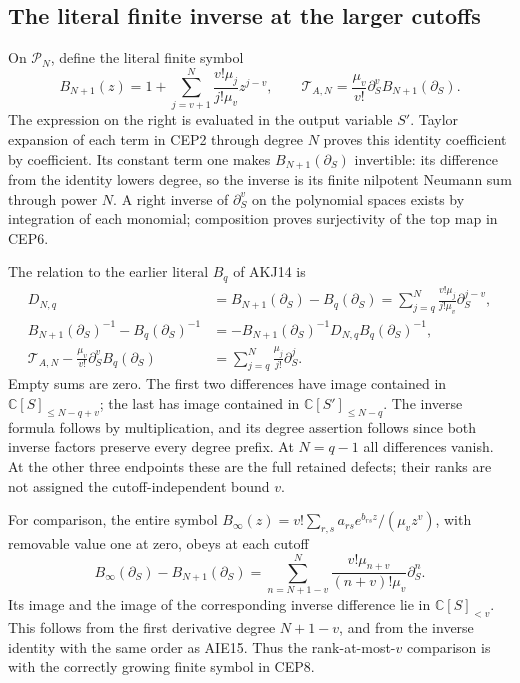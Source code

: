 \documentclass[11pt,a4paper]{article}
\begin{document}
\subsection{The literal finite inverse at the larger cutoffs}

On $\mathcal P_N$, define the literal finite symbol
\[
 B_{N+1}(z)=1+\sum_{j=v+1}^{N}
              \frac{v!\mu_j}{j!\mu_v}z^{j-v},\qquad
 \mathcal T_{A,N}=\frac{\mu_v}{v!}
                   \partial_S^vB_{N+1}(\partial_S).
 \tag{CEP8}
\]
The expression on the right is evaluated in the output variable
$S'$. Taylor expansion of each term in CEP2 through degree $N$
proves this identity coefficient by coefficient. Its constant term
one makes $B_{N+1}(\partial_S)$ invertible: its difference from
the identity lowers degree, so the inverse is its finite nilpotent
Neumann sum through power $N$. A right inverse of $\partial_S^v$
on the polynomial spaces exists by integration of each monomial;
composition proves surjectivity of the top map in CEP6.

The relation to the earlier literal $B_q$ of AKJ14 is
\[
 \begin{split}
 D_{N,q}&=B_{N+1}(\partial_S)-B_q(\partial_S)
       =\sum_{j=q}^{N}\frac{v!\mu_j}{j!\mu_v}\partial_S^{j-v},\\
 B_{N+1}(\partial_S)^{-1}-B_q(\partial_S)^{-1}
       &=-B_{N+1}(\partial_S)^{-1}D_{N,q}B_q(\partial_S)^{-1},\\
 \mathcal T_{A,N}-\frac{\mu_v}{v!}\partial_S^vB_q(\partial_S)
       &=\sum_{j=q}^{N}\frac{\mu_j}{j!}\partial_S^j.
 \end{split}\tag{CEP9}
\]
Empty sums are zero. The first two differences have image contained
in $\mathbb C[S]_{\le N-q+v}$; the last has image contained in
$\mathbb C[S']_{\le N-q}$. The inverse formula follows by
multiplication, and its degree assertion follows since both inverse
factors preserve every degree prefix. At $N=q-1$ all differences
vanish. At the other three endpoints these are the full retained
defects; their ranks are not assigned the cutoff-independent bound
$v$.

For comparison, the entire symbol
$B_\infty(z)=v!\sum_{r,s}a_{rs}e^{b_{rs}z}/(\mu_vz^v)$,
with removable value one at zero, obeys at each cutoff
\[
 B_\infty(\partial_S)-B_{N+1}(\partial_S)
 =\sum_{n=N+1-v}^{N}
       \frac{v!\mu_{n+v}}{(n+v)!\mu_v}\partial_S^n.
 \tag{CEP10}
\]
Its image and the image of the corresponding inverse difference
lie in $\mathbb C[S]_{<v}$. This follows from the first derivative
degree $N+1-v$, and from the inverse identity with the same order
as AIE15. Thus the rank-at-most-$v$ comparison is with the
correctly growing finite symbol in CEP8.
\end{document}
